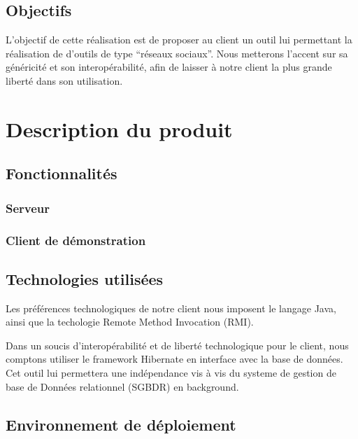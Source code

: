 \documentclass[10pt,a4paper]{article}
\begin{document}
  \subsection{Objectifs}
L'objectif de cette réalisation est de proposer au client un outil lui permettant la réalisation de d'outils de type ``réseaux sociaux''.
Nous metterons l'accent sur sa généricité et son interopérabilité, afin de laisser à notre client la plus grande liberté dans son utilisation.

\section{Description du produit}
 \subsection{Fonctionnalités}
  \subsubsection{Serveur}
  \subsubsection{Client de démonstration}
 \subsection{Technologies utilisées}
Les préférences technologiques de notre client nous imposent le langage Java, ainsi que la techologie
Remote Method Invocation (RMI).

Dans un soucis d'interopérabilité et de liberté technologique pour le client, nous comptons utiliser le framework Hibernate en interface avec la base de données. Cet outil lui permettera une indépendance vis à vis du systeme de gestion de base de Données relationnel (SGBDR) en background.

%
 \subsection{Environnement de déploiement}
\end{document}
